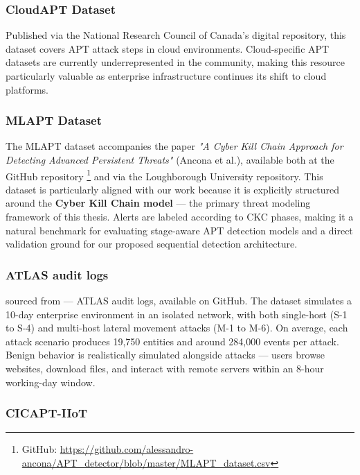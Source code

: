 \subsubsection{CloudAPT Dataset}

Published via the National Research Council of Canada's digital repository, this dataset covers APT attack steps in cloud environments. Cloud-specific APT datasets are currently underrepresented in the community, making this resource particularly valuable as enterprise infrastructure continues its shift to cloud platforms.

\subsubsection{MLAPT Dataset}

The MLAPT dataset accompanies the paper \textit{"A Cyber Kill Chain Approach for Detecting Advanced Persistent Threats"} (Ancona et al.), available both at the GitHub repository \footnote{GitHub: \url{https://github.com/alessandro-ancona/APT_detector/blob/master/MLAPT_dataset.csv}} and via the Loughborough University repository. This dataset is particularly aligned with our work because it is explicitly structured around the \textbf{Cyber Kill Chain model} --- the primary threat modeling framework of this thesis. Alerts are labeled according to CKC phases, making it a natural benchmark for evaluating stage-aware APT detection models and a direct validation ground for our proposed sequential detection architecture.

\subsubsection{ATLAS audit logs}

sourced from \cite{alsaheel2021atlas} — ATLAS audit logs, available on GitHub. The dataset simulates a 10-day enterprise environment in an isolated network, with both single-host (S-1 to S-4) and multi-host lateral movement attacks (M-1 to M-6). On average, each attack scenario produces 19,750 entities and around 284,000 events per attack. Benign behavior is realistically simulated alongside attacks — users browse websites, download files, and interact with remote servers within an 8-hour working-day window.

\subsubsection{CICAPT-IIoT}

